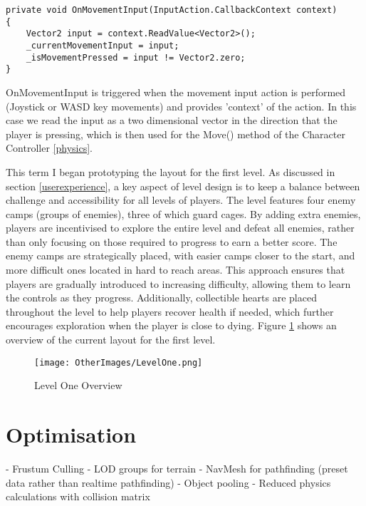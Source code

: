 \documentclass[]{final_report}
\begin{document}
\begin{verbatim}
private void OnMovementInput(InputAction.CallbackContext context)
{
    Vector2 input = context.ReadValue<Vector2>();
    _currentMovementInput = input;
    _isMovementPressed = input != Vector2.zero;
}
\end{verbatim}
OnMovementInput is triggered when the movement input action is performed (Joystick or WASD key movements) and provides 'context' of the action. In this case we read the input as a two dimensional vector in the direction that the player is pressing, which is then used for the Move() method of the Character Controller \ref{physics}.  \newline

This term I began prototyping the layout for the first level. As discussed in section \ref{userexperience}, a key aspect of level design is to keep a balance between challenge and accessibility for all levels of players. The level features four enemy camps (groups of enemies), three of which guard cages. By adding extra enemies, players are incentivised to explore the entire level and defeat all enemies, rather than only focusing on those required to progress to earn a better score. The enemy camps are strategically placed, with easier camps closer to the start, and more difficult ones located in hard to reach areas. This approach ensures that players are gradually introduced to increasing difficulty, allowing them to learn the controls as they progress. Additionally, collectible hearts are placed throughout the level to help players recover health if needed, which further encourages exploration when the player is close to dying. Figure \ref{fig:label_level} shows an overview of the current layout for the first level.
\begin{figure}[H]
    \centering
    \texttt{[image: OtherImages/LevelOne.png]}
    \caption{Level One Overview}
    \label{fig:label_level}
\end{figure}
\section{Optimisation}
\color{red}
- Frustum Culling\newline
- LOD groups for terrain\newline
- NavMesh for pathfinding (preset data rather than realtime pathfinding)\newline
- Object pooling\newline
- Reduced physics calculations with collision matrix\newline
\color{black}
\end{document}

